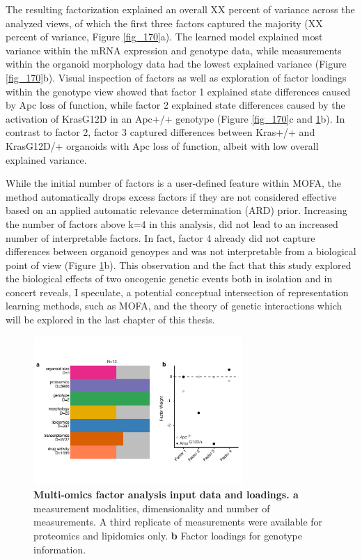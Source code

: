 \begin{flushleft}
The resulting factorization explained an overall XX percent of variance across the analyzed views, of which the first three factors captured the majority (XX percent of variance, Figure \ref{fig_170}a). The learned model explained most variance within the mRNA expression and genotype data, while measurements within the organoid morphology data had the lowest explained variance (Figure \ref{fig_170}b). Visual inspection of factors as well as exploration of factor loadings within the genotype view showed that factor 1 explained state differences caused by Apc loss of function, while factor 2 explained state differences caused by the activation of KrasG12D in an Apc+/+ genotype (Figure \ref{fig_170}c and \ref{fig_180}b). In contrast to factor 2, factor 3 captured differences between Kras+/+ and KrasG12D/+ organoids with Apc loss of function, albeit with low overall explained variance. 

While the initial number of factors is a user-defined feature within MOFA, the method automatically drops excess factors if they are not considered effective based on an applied automatic relevance determination (ARD) prior. Increasing the number of factors above k=4 in this analysis, did not lead to an increased number of interpretable factors. In fact, factor 4 already did not capture differences between organoid genoypes and was not interpretable from a biological point of view (Figure \ref{fig_180}b). This observation and the fact that this study explored the biological effects of two oncogenic genetic events both in isolation and in concert reveals, I speculate, a potential conceptual intersection of representation learning methods, such as MOFA, and the theory of genetic interactions which will be explored in the last chapter of this thesis. 

\begin{figure}[h]
\centering
\includegraphics[width=300,
                height=\textheight,
                keepaspectratio]{figures/adenomaprofiling/pdf/fig_1_8.pdf}
\caption{\textbf{Multi-omics factor analysis input data and loadings. a} measurement modalities, dimensionality and number of measurements. A third replicate of measurements were available for proteomics and lipidomics only. \textbf{b} Factor loadings for genotype information.} 
\label{fig_180}
\end{figure}
\bigbreak


\end{flushleft}
